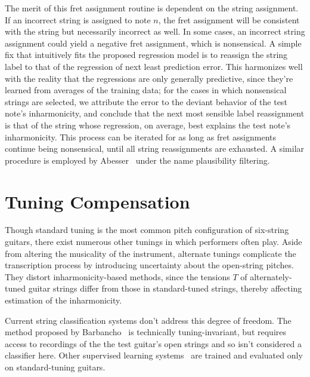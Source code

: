 \documentclass[12pt]{cmuthesis}
\begin{document}
The merit of this fret assignment routine is dependent on the string assignment. If an incorrect string is assigned to note $n$, the fret assignment will be consistent with the string but necessarily incorrect as well. In some cases, an incorrect string assignment could yield a negative fret assignment, which is nonsensical. A simple fix that intuitively fits the proposed regression model is to reassign the string label to that of the regression of next least prediction error. This harmonizes well with the reality that the regressions are only generally predictive, since they're learned from averages of the training data; for the cases in which nonsensical strings are selected, we attribute the error to the deviant behavior of the test note's inharmonicity, and conclude that the next most sensible label reassignment is that of the string whose regression, on average, best explains the test note's inharmonicity. This process can be iterated for as long as fret assignments continue being nonsensical, until all string reassignments are exhausted. A similar procedure is employed by Abesser~\cite{abesser2012} under the name plausibility filtering.

\section{Tuning Compensation}
Though standard tuning is the most common pitch configuration of six-string guitars, there exist numerous other tunings in which performers often play. Aside from altering the musicality of the instrument, alternate tunings complicate the transcription process by introducing uncertainty about the open-string pitches. They distort inharmonicity-based methods, since the tensions $T$ of alternately-tuned guitar strings differ from those in standard-tuned strings, thereby affecting estimation of the inharmonicity. 

Current string classification systems don't address this degree of freedom. The method proposed by Barbancho~\cite{barbanchoi2012} is technically tuning-invariant, but requires access to recordings of the the test guitar's open strings and so isn't considered a classifier here. Other supervised learning systems~\cite{kehling2014, dittmar2013, abesser2012} are trained and evaluated only on standard-tuning guitars.
\end{document}
